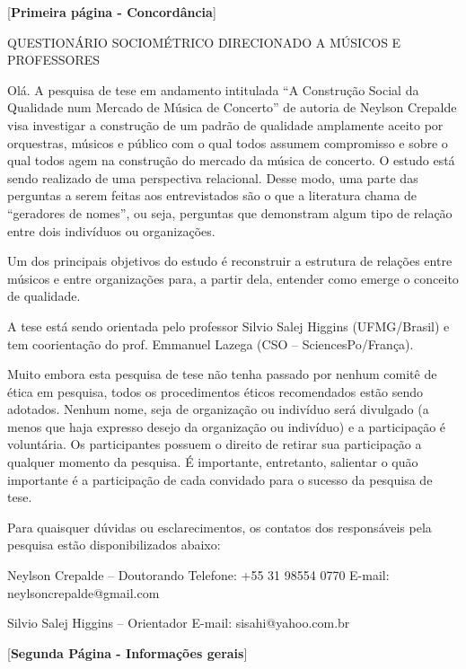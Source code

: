 \documentclass[a4paper, 12pt, openright, oneside, german, french, english, brazil]{abntex2}
\begin{document}
	[\textbf{Primeira página - Concordância}]
	
	QUESTIONÁRIO SOCIOMÉTRICO DIRECIONADO A MÚSICOS E PROFESSORES
	
	Olá. A pesquisa de tese em andamento intitulada ``A Construção Social da Qualidade num Mercado de Música de Concerto'' de autoria de Neylson Crepalde visa investigar a construção de um padrão de qualidade amplamente aceito por orquestras, músicos e público com o qual todos assumem compromisso e sobre o qual todos agem na construção do mercado da música de concerto. O estudo está sendo realizado de uma perspectiva relacional. Desse modo, uma parte das perguntas a serem feitas aos entrevistados são o que a literatura chama de “geradores de nomes”, ou seja, perguntas que demonstram algum tipo de relação entre dois indivíduos ou organizações.
	
	Um dos principais objetivos do estudo é reconstruir a estrutura de relações entre músicos e entre organizações para, a partir dela, entender como emerge o conceito de qualidade.
	
	A tese está sendo orientada pelo professor Silvio Salej Higgins (UFMG/Brasil) e tem coorientação do prof. Emmanuel Lazega (CSO – SciencesPo/França).
	
	Muito embora esta pesquisa de tese não tenha passado por nenhum comitê de ética em pesquisa, todos os procedimentos éticos recomendados estão sendo adotados. Nenhum nome, seja de organização ou indivíduo será divulgado (a menos que haja expresso desejo da organização ou indivíduo) e a participação é voluntária. Os participantes possuem o direito de retirar sua participação a qualquer momento da pesquisa. É importante, entretanto, salientar o quão importante é a participação de cada convidado para o sucesso da pesquisa de tese.
	
	Para quaisquer dúvidas ou esclarecimentos, os contatos dos responsáveis pela pesquisa estão disponibilizados abaixo:
	
	Neylson Crepalde – Doutorando
	Telefone: +55 31 98554 0770
	E-mail: neylsoncrepalde@gmail.com
	
	Silvio Salej Higgins – Orientador
	E-mail: sisahi@yahoo.com.br
	
	\vspace{1cm}
	
	[\textbf{Segunda Página - Informações gerais}] %
	
\end{document}
